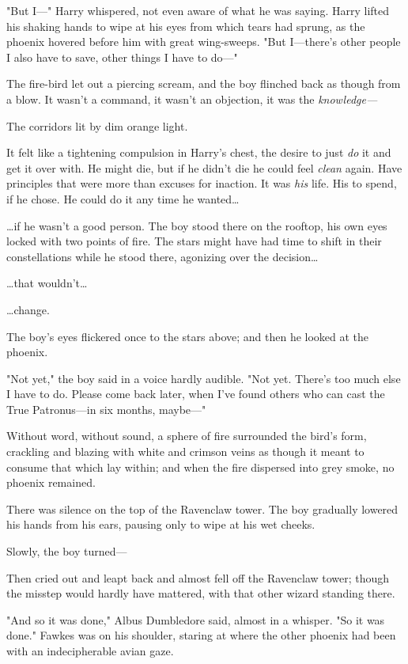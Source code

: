 "But I---" Harry whispered, not even aware of what he was saying. Harry lifted
his shaking hands to wipe at his eyes from which tears had sprung, as the
phoenix hovered before him with great wing-sweeps. "But I---there's other
people I also have to save, other things I have to do---"

The fire-bird let out a piercing scream, and the boy flinched back as though
from a blow. It wasn't a command, it wasn't an objection, it was the
\emph{knowledge---}

The corridors lit by dim orange light.

It felt like a tightening compulsion in Harry's chest, the desire to just
\emph{do} it and get it over with. He might die, but if he didn't die he could
feel \emph{clean} again. Have principles that were more than excuses for
inaction. It was \emph{his} life. His to spend, if he chose. He could do it any
time he wanted{\ldots}

{\ldots}if he wasn't a good person.
\sbreak
The boy stood there on the rooftop, his own eyes locked with two points of
fire. The stars might have had time to shift in their constellations while he
stood there, agonizing over the decision{\ldots}

{\ldots}that wouldn't{\ldots}

{\ldots}change.

The boy's eyes flickered once to the stars above; and then he looked at the
phoenix.

"Not yet," the boy said in a voice hardly audible. "Not yet. There's too much
else I have to do. Please come back later, when I've found others who can cast
the True Patronus---in six months, maybe---"

Without word, without sound, a sphere of fire surrounded the bird's form,
crackling and blazing with white and crimson veins as though it meant to
consume that which lay within; and when the fire dispersed into grey smoke, no
phoenix remained.

There was silence on the top of the Ravenclaw tower. The boy gradually lowered
his hands from his ears, pausing only to wipe at his wet cheeks.

Slowly, the boy turned---

Then cried out and leapt back and almost fell off the Ravenclaw tower; though
the misstep would hardly have mattered, with that other wizard standing there.

"And so it was done," Albus Dumbledore said, almost in a whisper. "So it was
done." Fawkes was on his shoulder, staring at where the other phoenix had been
with an indecipherable avian gaze.


